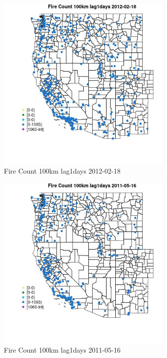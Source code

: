 \begin{figure} 
\centering  
\includegraphics[width=0.77\textwidth]{Code_Outputs/Report_ML_input_PM25_Step4_part_f_de_duplicated_aveswNAs_MapObsFire_Count_100km_lag1days2012-02-18.jpg} 
\caption{\label{fig:Report_ML_input_PM25_Step4_part_f_de_duplicated_aveswNAsMapObsFire_Count_100km_lag1days2012-02-18}Fire Count 100km lag1days 2012-02-18} 
\end{figure} 
 

\begin{figure} 
\centering  
\includegraphics[width=0.77\textwidth]{Code_Outputs/Report_ML_input_PM25_Step4_part_f_de_duplicated_aveswNAs_MapObsFire_Count_100km_lag1days2011-05-16.jpg} 
\caption{\label{fig:Report_ML_input_PM25_Step4_part_f_de_duplicated_aveswNAsMapObsFire_Count_100km_lag1days2011-05-16}Fire Count 100km lag1days 2011-05-16} 
\end{figure} 
 

